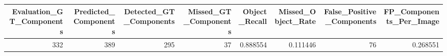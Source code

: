 \begin{tabular}{rrrrrrrr}
\toprule
Evaluation_GT_Components & Predicted_Components & Detected_GT_Components & Missed_GT_Components & Object_Recall & Missed_Object_Rate & False_Positive_Components & FP_Components_Per_Image \\
\midrule
332 & 389 & 295 & 37 & 0.888554 & 0.111446 & 76 & 0.268551 \\
\bottomrule
\end{tabular}
